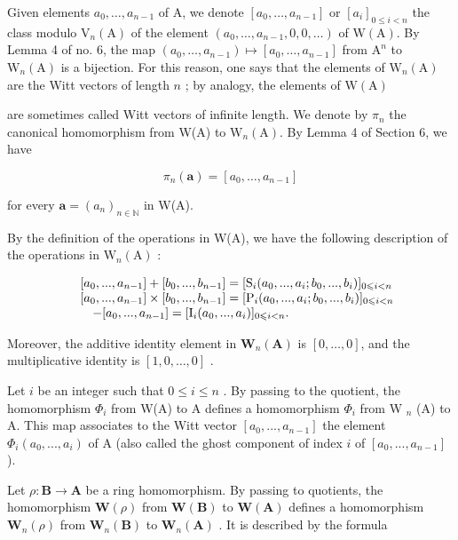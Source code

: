 Given elements \(a_0, \ldots, a_{n-1}\) of A, we denote \([a_0, \ldots, a_{n-1}]\) or \([a_i]_{0 \leq i < n}\) the class modulo \(\mathrm{V}_n(\mathrm{A})\) of the element \((a_0, \ldots, a_{n-1}, 0, 0, \ldots)\) of \(\mathrm{W}(\mathrm{A})\). By Lemma 4 of no. 6, the map \((a_0, \ldots, a_{n-1}) \mapsto [a_0, \ldots, a_{n-1}]\) from \(\mathrm{A}^n\) to \(\mathrm{W}_n(\mathrm{A})\) is a bijection. For this reason, one says that the elements of \(\mathrm{W}_n(\mathrm{A})\) are the Witt vectors of length \(n\) ; by analogy, the elements of \(\mathrm{W}(\mathrm{A})\)

are sometimes called Witt vectors of infinite length. We denote by \(\pi_n\) the canonical homomorphism from W(A) to \(\mathrm{W}_n(\mathrm{A})\). By Lemma 4 of Section 6, we have

\[
\pi_ {n} (\boldsymbol {a}) = [ a _ {0}, \dots , a _ {n - 1} ]\tag{42}
\]

for every \(\boldsymbol{a} = (a_{n})_{n \in \mathbb{N}}\) in W(A).

By the definition of the operations in W(A), we have the following description of the operations in \(\mathrm{W}_{n}(\mathrm{A})\) :

\[
\begin{array}{r l} & {[ a _ {0},..., a _ {n - 1} ] + [ b _ {0},..., b _ {n - 1} ] = [ \mathrm{S} _ {i} (a _ {0},..., a _ {i}; b _ {0},..., b _ {i}) ] _ {0 \leqslant i <   n}} \\ & {[ a _ {0},..., a _ {n - 1} ] \times [ b _ {0},..., b _ {n - 1} ] = [ \mathrm{P} _ {i} (a _ {0},..., a _ {i}; b _ {0},..., b _ {i}) ] _ {0 \leqslant i <   n}} \\ & {\quad - [ a _ {0},..., a _ {n - 1} ] = [ \mathrm{I} _ {i} (a _ {0},..., a _ {i}) ] _ {0 \leqslant i <   n}.} \end{array}
\]

Moreover, the additive identity element in \(\mathbf{W}_{n}(\mathbf{A})\) is \([0,\dots,0]\), and the multiplicative identity is \([1,0,\dots,0]\) .

Let \(i\) be an integer such that \(0 \leqslant i \leqslant n\) . By passing to the quotient, the homomorphism \(\Phi_{i}\) from W(A) to A defines a homomorphism \(\Phi_{i}\) from W \(_{n}\) (A) to A. This map associates to the Witt vector \([a_{0}, ..., a_{n-1}]\) the element \(\Phi_{i}(a_{0}, ..., a_{i})\) of A (also called the ghost component of index \(i\) of \([a_{0}, ..., a_{n-1}]\) ).

Let \(\rho : \mathbf{B} \to \mathbf{A}\) be a ring homomorphism. By passing to quotients, the homomorphism \(\mathbf{W}(\rho)\) from \(\mathbf{W}(\mathbf{B})\) to \(\mathbf{W}(\mathbf{A})\) defines a homomorphism \(\mathbf{W}_n(\rho)\) from \(\mathbf{W}_n(\mathbf{B})\) to \(\mathbf{W}_n(\mathbf{A})\) . It is described by the formula

